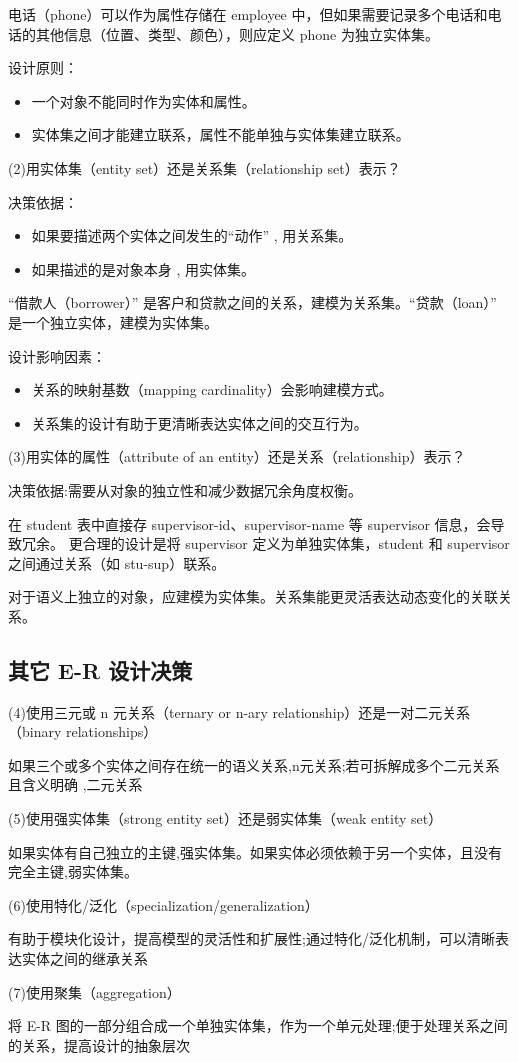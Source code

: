 电话（phone）可以作为属性存储在 employee 中，但如果需要记录多个电话和电话的其他信息（位置、类型、颜色），则应定义 phone 为独立实体集。

设计原则：
\begin{itemize}
    \item 一个对象不能同时作为实体和属性。
    \item 实体集之间才能建立联系，属性不能单独与实体集建立联系。
\end{itemize}

(2)用实体集（entity set）还是关系集（relationship set）表示？

决策依据：
\begin{itemize}
    \item 如果要描述两个实体之间发生的“动作” , 用关系集。
    \item 如果描述的是对象本身 , 用实体集。
\end{itemize}

“借款人（borrower）” 是客户和贷款之间的关系，建模为关系集。“贷款（loan）” 是一个独立实体，建模为实体集。

设计影响因素：
\begin{itemize}
    \item 关系的映射基数（mapping cardinality）会影响建模方式。
    \item 关系集的设计有助于更清晰表达实体之间的交互行为。
\end{itemize}

(3)用实体的属性（attribute of an entity）还是关系（relationship）表示？

决策依据:需要从对象的独立性和减少数据冗余角度权衡。

在 student 表中直接存 supervisor-id、supervisor-name 等 supervisor 信息，会导致冗余。
更合理的设计是将 supervisor 定义为单独实体集，student 和 supervisor 之间通过关系（如 stu-sup）联系。

对于语义上独立的对象，应建模为实体集。关系集能更灵活表达动态变化的关联关系。

\subsection{其它 E-R 设计决策}

(4)使用三元或 n 元关系（ternary or n-ary relationship）还是一对二元关系（binary relationships）

如果三个或多个实体之间存在统一的语义关系,n元关系;若可拆解成多个二元关系且含义明确 ,二元关系

(5)使用强实体集（strong entity set）还是弱实体集（weak entity set）

如果实体有自己独立的主键,强实体集。如果实体必须依赖于另一个实体，且没有完全主键,弱实体集。

(6)使用特化/泛化（specialization/generalization）

有助于模块化设计，提高模型的灵活性和扩展性;通过特化/泛化机制，可以清晰表达实体之间的继承关系

(7)使用聚集（aggregation）

将 E-R 图的一部分组合成一个单独实体集，作为一个单元处理;便于处理关系之间的关系，提高设计的抽象层次